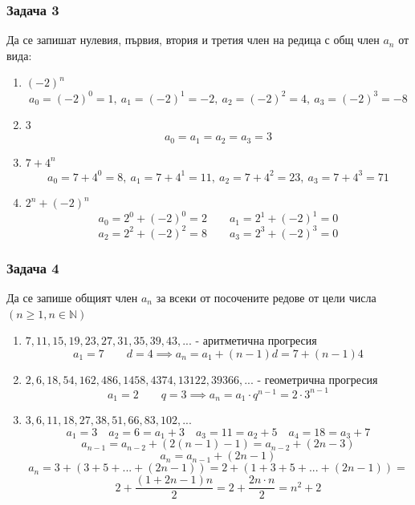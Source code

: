 \documentclass[fleqn, 12pt]{article}
\theoremstyle{definition}
\begin{document}
\subsubsection*{Задача 3}
Да се запишат нулевия, първия, втория и третия член на редица с общ член $a_n$ от вида:
\begin{enumerate}
\item $(-2)^n$\\
$$a_0 = (-2)^0 = 1, \  a_1 = (-2)^1 = -2, \  a_2 = (-2)^2 = 4, \ a_3 = (-2)^3 = -8$$
\item 3\\
$$a_0 = a_1 = a_2 = a_3 = 3$$
\item $7 + 4^n$\\
$$a_0 = 7 + 4^0 = 8, \ a_1 = 7 + 4^1 = 11, \ a_2 = 7 + 4^2 = 23,  \ a_3 = 7 + 4^3 = 71 $$
\item $2^n + (-2)^n$\\
$$a_0 = 2^0 + (-2)^0 = 2 \qquad a_1 = 2^1 + (-2)^1 = 0$$
$$ a_2 = 2^2 + (-2)^2 = 8 \qquad  a_3 = 2^3 + (-2)^3 = 0$$
\end{enumerate}

\subsubsection*{Задача 4}
Да се запише общият член $a_n$ за всеки от посочените редове от цели числа $(n \geq 1, n \in \mathbb{N})$
\begin{enumerate}
\item $ 7, 11, 15, 19, 23, 27, 31, 35, 39, 43, ... $ - аритметична прогресия
$$a_1 = 7 \qquad d = 4 \implies a_n = a_1 +(n-1)d = 7 + (n-1)4$$
\item $ 2, 6, 18, 54, 162, 486, 1458, 4374, 13122, 39366, ... $ - геометрична прогресия
$$a_1 = 2 \qquad q = 3 \implies a_n = a_1 \cdot q^{n-1} = 2 \cdot 3^{n-1}$$
\item $ 3, 6, 11, 18, 27, 38, 51, 66, 83, 102, ... $
$$a_1 = 3 \quad a_2 = 6 = a_1 + 3 \quad a_3 = 11 = a_2 + 5 \quad a_4 = 18 = a_3 + 7$$
$$a_{n-1} = a_{n-2} + (2(n-1) - 1) = a_{n-2} + (2n - 3)$$
$$a_n = a_{n-1} + (2n-1)$$
$$a_n = 3+(3+5+...+(2n-1)) = 2 + (1+3+5+...+(2n-1)) = $$
$$2 + \frac{(1+2n-1)n}{2} = 2 + \frac{2n \cdot n}{2} = n^2 + 2$$
\end{enumerate}
\end{document}
